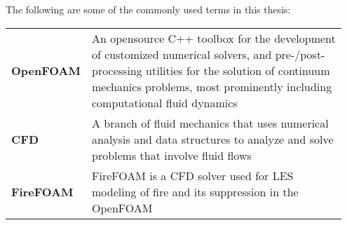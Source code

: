 \glossary

The following are some of the commonly used terms in this thesis: 
\\
\begin{tabular}{p{0.15\linewidth}p{0.8\linewidth}}
\textbf{OpenFOAM} & An opensource C++ toolbox for the development of 
customized numerical solvers, and pre-/post-processing utilities for the solution of continuum mechanics problems, most prominently including computational fluid dynamics \\
\textbf{CFD} & A branch of fluid mechanics that uses numerical analysis and data structures to analyze and solve problems that involve fluid flows \\
\textbf{FireFOAM} & FireFOAM is a CFD solver used for LES modeling of fire and its suppression in the OpenFOAM \\
\end{tabular}
